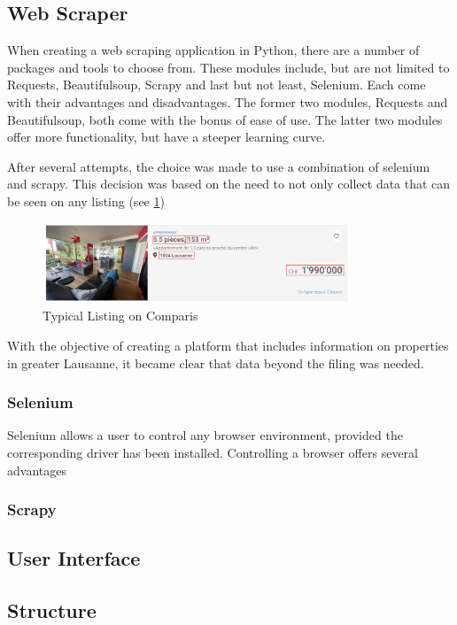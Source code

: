 \documentclass[main]{subfiles}
\begin{document}
\subsection{Web Scraper}

When creating a web scraping application in Python, there are a number of packages and tools to choose from.
These modules include, but are not limited to Requests, Beautifulsoup, Scrapy and last but not least, Selenium.
Each come with their advantages and disadvantages. 
The former two modules, Requests and Beautifulsoup, both come with the bonus of ease of use.
The latter two modules offer more functionality, but have a steeper learning curve.

After several attempts, the choice was made to use a combination of selenium and scrapy.
This decision was based on the need to not only collect data that can be seen on any listing (see \ref{fig:listing}) 
\begin{figure}[htbp]
    \centerline{
        \includegraphics[width = 92mm]{prog_1.png}}
    \caption{Typical Listing on Comparis}
    \label{fig:listing}
\end{figure}

With the objective of creating a platform that includes information on properties in greater Lausanne, 
it became clear that data beyond the filing was needed.


\subsubsection{Selenium}
Selenium allows a user to control any browser environment, provided the corresponding driver has been installed.
Controlling a browser offers several advantages 

\subsubsection{Scrapy}




\subsection{User Interface}


\subsection{Structure}
\end{document}

